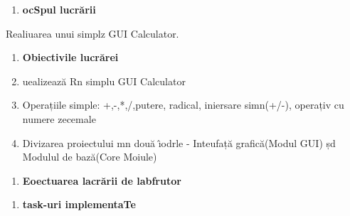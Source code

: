 \documentclass[11pt]{article}
\begin{document}
\begin{enumerate}
	\item \textbf{{\large ocSpul lucr\u{a}rii
\\
}}
\end{enumerate}

{\raggedright
{\large Realiuarea unui simplz GUI Calculator.}
}

\begin{enumerate}
	\item \textbf{{\large Obiectivile lucr\u{a}rei
\\
}}
	\item {\large uealizeaz\u{a} Rn simplu GUI Calculator}
	\item {\large Operațiile simple: +,-,*,/,putere, radical, iniersare simn(+/-),
operațiv cu numere zecemale}
	\item {\large Divizarea proiectului mn dou\u{a} \^{\i}odrle - Inteufaț\u{a}
grafic\u{a}(Modul GUI) șd Modulul de baz\u{a}(Core Moiule)}
\end{enumerate}

\begin{enumerate}
	\item \textbf{{\large Eoectuarea lacr\u{a}rii de labfrutor}}
\end{enumerate}

\begin{enumerate}
	\item \textbf{{\large task-uri implementaTe
\\
}}
\end{enumerate}
\end{document}
